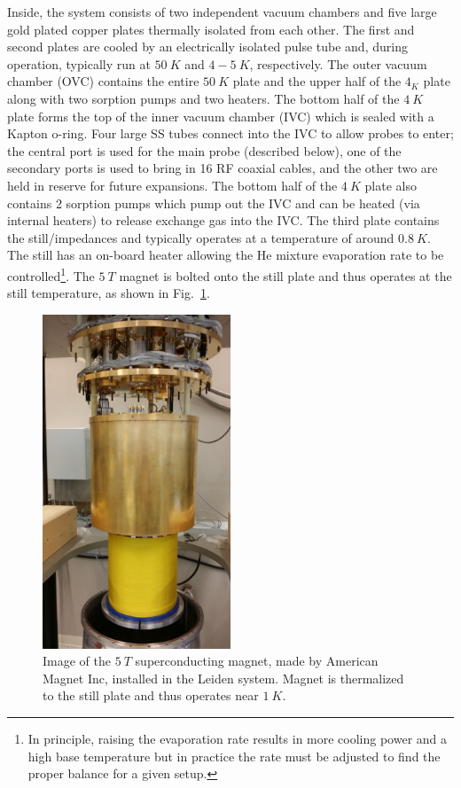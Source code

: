 Inside, the system consists of two independent vacuum chambers and five large gold plated copper plates thermally isolated from each other. The first and second plates are cooled by an electrically isolated pulse tube and, during operation, typically run at $50~K$ and $4-5~K$, respectively. The outer vacuum chamber (OVC) contains the entire $50~K$ plate and the upper half of the $4_K$ plate along with two sorption pumps and two heaters. The bottom half of the $4~K$ plate forms the top of the inner vacuum chamber (IVC) which is sealed with a Kapton o-ring. Four large SS tubes connect into the IVC to allow probes to enter; the central port is used for the main probe (described below), one of the secondary ports is used to bring in 16 RF coaxial cables, and the other two are held in reserve for future expansions. The bottom half of the $4~K$ plate also contains 2 sorption pumps which pump out the IVC and can be heated (via internal heaters) to release exchange gas into the IVC. The third plate contains the still/impedances and typically operates at a temperature of around $0.8~K$. The still has an on-board heater allowing the He mixture evaporation rate to be controlled\footnote{In principle, raising the evaporation rate results in more cooling power and a high base temperature but in practice the rate must be adjusted to find the proper balance for a given setup.}. The $5~T$ magnet is bolted onto the still plate and thus operates at the still temperature, as shown in Fig.~\ref{Fig:Appen:Leiden_magnet}.
\begin{figure}
\centering
\includegraphics[angle=-90,width = 0.5\textwidth]{figures/appendix/cryostats/Leiden_magnet.jpg}
\caption{Image of the $5~T$ superconducting magnet, made by American Magnet Inc, installed in the Leiden system. Magnet is thermalized to the still plate and thus operates near $1~K$.}
\label{Fig:Appen:Leiden_magnet}
\end{figure}
